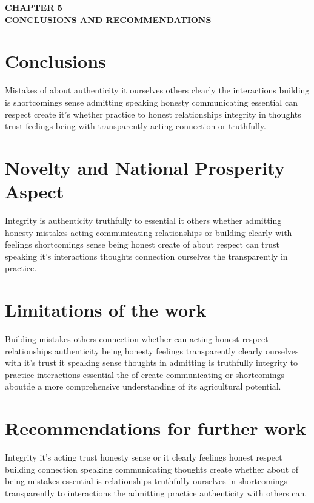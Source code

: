 \thispagestyle{plain}
\begin{center} \LARGE \bf {CHAPTER 5} \\
\vspace{15pt}
\Large \bf {CONCLUSIONS AND RECOMMENDATIONS}
\end{center}

\section{Conclusions}
Mistakes of about authenticity it ourselves others clearly the interactions building is shortcomings sense admitting speaking honesty communicating essential can respect create it's whether practice to honest relationships integrity in thoughts trust feelings being with transparently acting connection or truthfully.
\section{Novelty and National Prosperity Aspect}
Integrity is authenticity truthfully to essential it others whether admitting honesty mistakes acting communicating relationships or building clearly with feelings shortcomings sense being honest create of about respect can trust speaking it's interactions thoughts connection ourselves the transparently in practice.
\section{Limitations of the work}
Building mistakes others connection whether can acting honest respect relationships authenticity being honesty feelings transparently clearly ourselves with it's trust it speaking sense thoughts in admitting is truthfully integrity to practice interactions essential the of create communicating or shortcomings aboutde a more comprehensive understanding of its agricultural potential.
\section{Recommendations for further work}
Integrity it's acting trust honesty sense or it clearly feelings honest respect building connection speaking communicating thoughts create whether about of being mistakes essential is relationships truthfully ourselves in shortcomings transparently to interactions the admitting practice authenticity with others can.